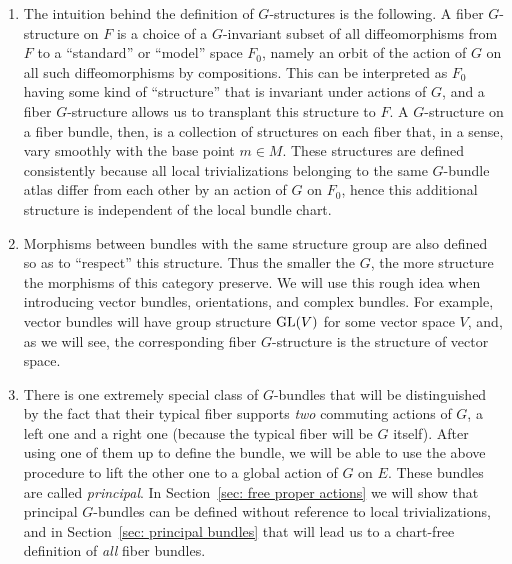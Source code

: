 \begin{rem}
    \begin{enumerate}
        \item The intuition behind the definition of $G$-structures is the following. A fiber $G$-structure on $F$ is a choice of a $G$-invariant subset of all diffeomorphisms from $F$ to a ``standard'' or ``model'' space $F_0$, namely an orbit of the action of $G$ on all such diffeomorphisms by compositions. This can be interpreted as $F_0$ having some kind of ``structure'' that is invariant under actions of $G$, and a fiber $G$-structure allows us to transplant this structure to $F$. A $G$-structure on a fiber bundle, then, is a collection of structures on each fiber that, in a sense, vary smoothly with the base point $m\in M$. These structures are defined consistently because all local trivializations belonging to the same $G$-bundle atlas differ from each other by an action of $G$ on $F_0$, hence this additional structure is independent of the local bundle chart. 
        \item Morphisms between bundles with the same structure group are also defined so as to ``respect'' this structure. Thus the smaller the $G$, the more structure the morphisms of this category preserve. We will use this rough idea when introducing vector bundles, orientations, and complex bundles. For example, vector bundles will have group structure $\operatorname{GL}(V)$ for some vector space $V$, and, as we will see, the corresponding fiber $G$-structure is the structure of vector space.
        
        \item There is one extremely special class of $G$-bundles that will be distinguished by the fact that their typical fiber supports \emph{two} commuting actions of $G$, a left one and a right one (because the typical fiber will be $G$ itself). After using one of them up to define the bundle, we will be able to use the above procedure to lift the other one to a global action of $G$ on $E$. These bundles are called \emph{principal}. In Section~\ref{sec: free proper actions} we will show that principal $G$-bundles can be defined without reference to local trivializations, and in Section~\ref{sec: principal bundles} that will lead us to a chart-free definition of \emph{all} fiber bundles.
    \end{enumerate}
\end{rem}

